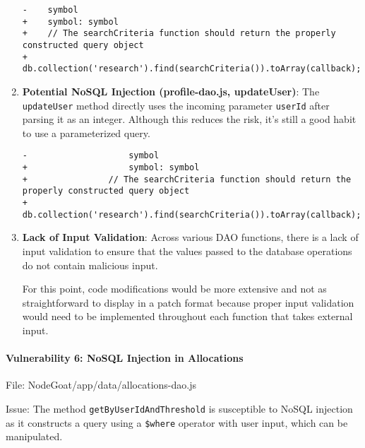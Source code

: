 \begin{enumerate}
  \begin{framed}
    \scriptsize
    \begin{verbatim}
-    symbol
+    symbol: symbol
+    // The searchCriteria function should return the properly constructed query object
+    db.collection('research').find(searchCriteria()).toArray(callback);
  \end{verbatim}
  \end{framed}
  \item
    \textbf{Potential NoSQL Injection (profile-dao.js, updateUser)}: The
    \texttt{updateUser} method directly uses the incoming parameter
    \texttt{userId} after parsing it as an integer. Although this reduces
    the risk, it's still a good habit to use a parameterized query.
  \begin{framed}
    \scriptsize
    \begin{verbatim}
-                    symbol
+                    symbol: symbol
+                // The searchCriteria function should return the properly constructed query object
+                db.collection('research').find(searchCriteria()).toArray(callback);
    \end{verbatim}
  \end{framed}
  \item
    \textbf{Lack of Input Validation}: Across various DAO functions, there
    is a lack of input validation to ensure that the values passed to the
    database operations do not contain malicious input.
  
    For this point, code modifications would be more extensive and not as
    straightforward to display in a patch format because proper input
    validation would need to be implemented throughout each function that
    takes external input.
  \end{enumerate}
  
  \hypertarget{vulnerability-6-nosql-injection-in-allocations}{%
  \paragraph{Vulnerability 6: NoSQL Injection in
  Allocations}\label{vulnerability-6-nosql-injection-in-allocations}}
  
  File: NodeGoat/app/data/allocations-dao.js
  
  Issue: The method \texttt{getByUserIdAndThreshold} is susceptible to
  NoSQL injection as it constructs a query using a \texttt{\$where}
  operator with user input, which can be manipulated.
  
